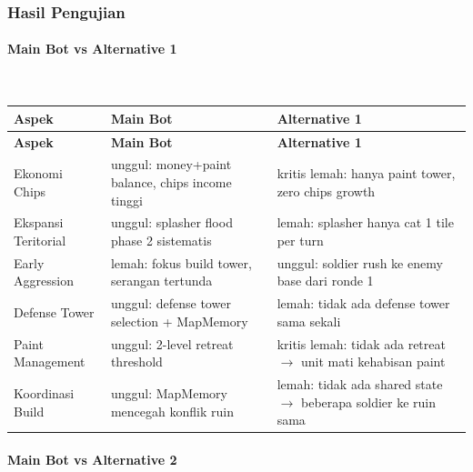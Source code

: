\documentclass{article}
\begin{document}
\begin{enumerate}[label=\alph*.]
\subsubsection{Hasil Pengujian}

\paragraph{Main Bot vs Alternative 1}
\mbox{}\\[2pt]

\begin{longtable}{|p{3cm}|p{5.5cm}|p{5.5cm}|}
\hline
\textbf{Aspek} & \textbf{Main Bot} & \textbf{Alternative 1} \\
\hline
\endfirsthead
\hline
\textbf{Aspek} & \textbf{Main Bot} & \textbf{Alternative 1} \\
\hline
\endhead
\hline
\endfoot
Ekonomi Chips
& unggul: money+paint balance, chips income tinggi
& kritis lemah: hanya paint tower, zero chips growth \\
\hline
Ekspansi Teritorial
& unggul: splasher flood phase 2 sistematis
& lemah: splasher hanya cat 1 tile per turn \\
\hline
Early Aggression
& lemah: fokus build tower, serangan tertunda
& unggul: soldier rush ke enemy base dari ronde 1 \\
\hline
Defense Tower
& unggul: defense tower selection + MapMemory
& lemah: tidak ada defense tower sama sekali \\
\hline
Paint Management
& unggul: 2-level retreat threshold
& kritis lemah: tidak ada retreat $\rightarrow$ unit mati kehabisan paint \\
\hline
Koordinasi Build
& unggul: MapMemory mencegah konflik ruin
& lemah: tidak ada shared state $\rightarrow$ beberapa soldier ke ruin sama \\
\hline
\end{longtable}

\medskip

\paragraph{Main Bot vs Alternative 2}
\mbox{}\\[2pt]


\end{enumerate}
\end{document}
